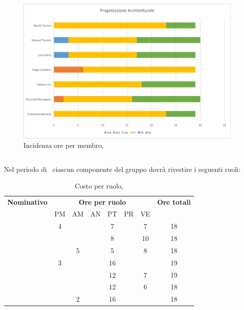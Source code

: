 \begin{figure}[H]
	\centering 
	\includegraphics[scale=0.7]{Immagini/GraficiPianoLavoro/PA.png}
	\caption{Incidenza ore per membro, \PA}
\end{figure}

\newpage
\subsection{\PD}
Nel periodo di \PD\ ciascun componente del gruppo dovrà rivestire i seguenti ruoli:

\begin{table}[h]
	\begin{center}
		\begin{tabular}{|c|c|c|c|c|c|c|c|}
			\hline
			\textbf{Nominativo} & \multicolumn{6}{c|}{\textbf{Ore per ruolo}} & \textbf{Ore totali} \\
					& PM & AM & AN & PT & PR & VE & \\
			\hline
			\FB		& 4  &	  &	   & 7	&	 & 7  &	18	\\
			\hline
			\RM		&	 &	  &	   & 8	&	 & 10 & 18	\\
			\hline
			\SL		&	 & 5  &	   & 5	&	 & 8  &	18	\\
			\hline
			\DC		& 3	 &	  &	   & 16	&	 & 	  &	19	\\
			\hline
			\LD 	&	 &	  &	   & 12	&	 & 7  &	19	\\
			\hline
			\MT		& 	 & 	  &	   & 12	&	 & 6  &	18	\\
			\hline
			\ND 	&	 & 2  &	   & 16	&	 &	  & 18	\\
			\hline
		\end{tabular}
	\end{center}
	\caption{Costo per ruolo, \PD}
\end{table}

